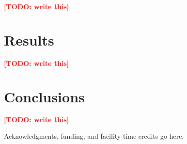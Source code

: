 \documentclass[twocolumn]{aastex702}
\newcommand{\todo}[1]{\textcolor{red}{\textbf{[TODO: #1]}}}
\begin{document}
\todo{write this}

%

\section{Results}
\label{sec:results}

\todo{write this}

\section{Conclusions}
\label{sec:conclusions}

\todo{write this}

\begin{acknowledgments}
  Acknowledgments, funding, and facility-time credits go here.
\end{acknowledgments}

\facilities{}





\end{document}

